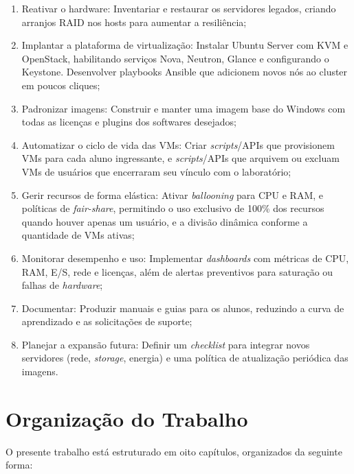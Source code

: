 \begin{enumerate}
    \item Reativar o hardware: Inventariar e restaurar os servidores legados, criando arranjos RAID nos hosts para aumentar a resiliência;
    \item Implantar a plataforma de virtualização: Instalar Ubuntu Server com KVM e OpenStack, habilitando serviços Nova, Neutron, Glance e configurando o Keystone. Desenvolver playbooks Ansible que adicionem novos nós ao cluster em poucos cliques;
    \item Padronizar imagens: Construir e manter uma imagem base do Windows com todas as licenças e plugins dos softwares desejados;
    \item Automatizar o ciclo de vida das VMs: Criar \textit{scripts}/APIs que provisionem VMs para cada aluno ingressante, e \textit{scripts}/APIs que arquivem ou excluam VMs de usuários que encerraram seu vínculo com o laboratório;
    \item Gerir recursos de forma elástica: Ativar \textit{ballooning} para CPU e RAM, e políticas de \textit{fair-share}, permitindo o uso exclusivo de 100\% dos recursos quando houver apenas um usuário, e a divisão dinâmica conforme a quantidade de VMs ativas;
    \item Monitorar desempenho e uso: Implementar \textit{dashboards} com métricas de CPU, RAM, E/S, rede e licenças, além de alertas preventivos para saturação ou falhas de \textit{hardware};
    \item Documentar: Produzir manuais e guias para os alunos, reduzindo a curva de aprendizado e as solicitações de suporte;
    \item Planejar a expansão futura: Definir um \textit{checklist} para integrar novos servidores (rede, \textit{storage}, energia) e uma política de atualização periódica das imagens.
\end{enumerate}

\section{Organização do Trabalho}

O presente trabalho está estruturado em oito capítulos, organizados da seguinte forma:

